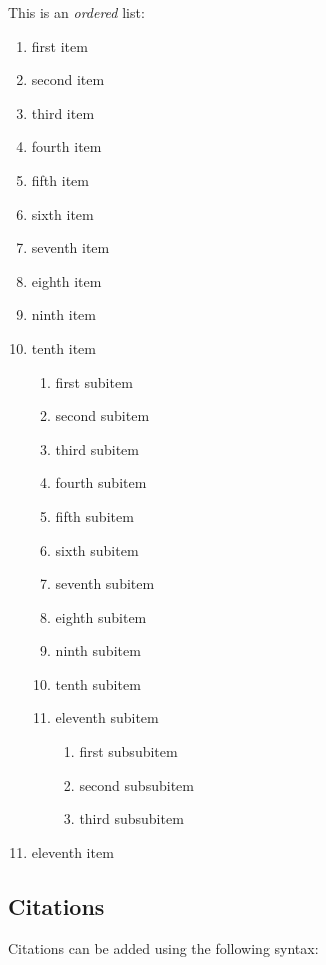 \documentclass{article}
\begin{document}
\noindent This is an \emph{ordered} list:

\begin{enumerate}
\def\labelenumi{\arabic{enumi}.}
\tightlist
\item
  first item
\item
  second item
\item
  third item
\item
  fourth item
\item
  fifth item
\item
  sixth item
\item
  seventh item
\item
  eighth item
\item
  ninth item
\item
  tenth item

  \begin{enumerate}
  \def\labelenumii{\roman{enumii}.}
  \tightlist
  \item
    first subitem
  \item
    second subitem
  \item
    third subitem
  \item
    fourth subitem
  \item
    fifth subitem
  \item
    sixth subitem
  \item
    seventh subitem
  \item
    eighth subitem
  \item
    ninth subitem
  \item
    tenth subitem
  \item
    eleventh subitem

    \begin{enumerate}
    \def\labelenumiii{\alph{enumiii}.}
    \tightlist
    \item
      first subsubitem
    \item
      second subsubitem
    \item
      third subsubitem
    \end{enumerate}
  \end{enumerate}
\item
  eleventh item
\end{enumerate}

\hypertarget{citations}{%
\subsection{Citations}\label{citations}}

Citations can be added using the following syntax:
\end{document}
